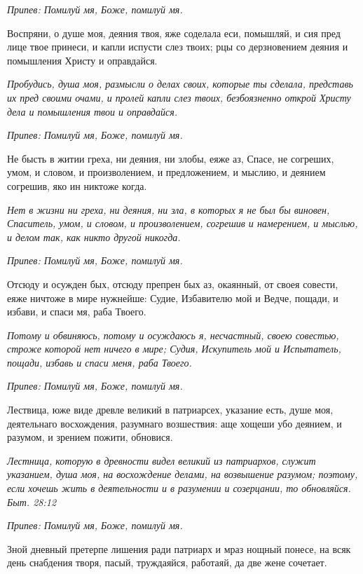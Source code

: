 \itshape Припев:\normalfont{} Помилуй мя, Боже, помилуй мя.


Воспряни, о душе моя, деяния твоя, яже соделала еси, помышляй, и сия пред лице твое принеси, и капли испусти слез твоих; рцы со дерзновением деяния и помышления Христу и оправдайся.


\itshape Пробудись, душа моя, размысли о делах своих, которые ты сделала, представь их пред своими очами, и пролей капли слез твоих, безбоязненно открой Христу дела и помышления твои и оправдайся.\normalfont{}


\itshape Припев:\normalfont{} Помилуй мя, Боже, помилуй мя.


Не бысть в житии греха, ни деяния, ни злобы, еяже аз, Спасе, не согреших, умом, и словом, и произволением, и предложением, и мыслию, и деянием согрешив, яко ин никтоже когда.


\itshape Нет в жизни ни греха, ни деяния, ни зла, в которых я не был бы виновен, Спаситель, умом, и словом, и произволением, согрешив и намерением, и мыслью, и делом так, как никто другой никогда.\normalfont{}


\itshape Припев:\normalfont{} Помилуй мя, Боже, помилуй мя.


Отсюду и осужден бых, отсюду препрен бых аз, окаянный, от своея совести, еяже ничтоже в мире нужнейше: Судие, Избавителю мой и Ведче, пощади, и избави, и спаси мя, раба Твоего.


\itshape Потому и обвиняюсь, потому и осуждаюсь я, несчастный, своею совестью, строже которой нет ничего в мире; Судия, Искупитель мой и Испытатель, пощади, избавь и спаси меня, раба Твоего.\normalfont{}


\itshape Припев:\normalfont{} Помилуй мя, Боже, помилуй мя.


Лествица, юже виде древле великий в патриарсех, указание есть, душе моя, деятельнаго восхождения, разумнаго возшествия: аще хощеши убо деянием, и разумом, и зрением пожити, обновися.


\itshape Лестница, которую в древности видел великий из патриархов, служит указанием, душа моя, на восхождение делами, на возвышение разумом; поэтому, если хочешь жить в деятельности и в разумении и созерцании, то обновляйся. Быт. 28:12\normalfont{}


\itshape Припев:\normalfont{} Помилуй мя, Боже, помилуй мя.


Зной дневный претерпе лишения ради патриарх и мраз нощный понесе, на всяк день снабдения творя, пасый, труждаяйся, работаяй, да две жене сочетает.


